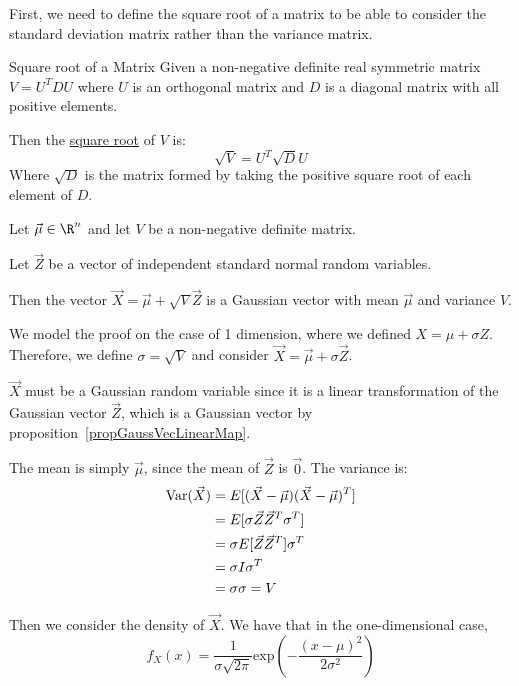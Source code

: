 \documentclass[../Main.tex]{subfiles}
\begin{document}
First, we need to define the square root of a matrix to be able to consider the standard deviation matrix rather than the variance matrix.
\begin{definition}{Square root of a Matrix}
    Given a non-negative definite real symmetric matrix $V = U^T D U$ where $U$ is an orthogonal matrix and $D$ is a diagonal matrix with all positive elements.

    Then the \underline{square root} of $V$ is:
    \begin{equation*}
        \sqrt{V} = U^T \sqrt{D} U
    \end{equation*}
    Where $\sqrt{D}$ is the matrix formed by taking the positive square root of each element of $D$.
\end{definition}
\begin{theorem}
    Let $\vec{\mu} \in \R^n$ and let $V$ be a non-negative definite matrix.

    Let $\vec{Z}$ be a vector of independent standard normal random variables.

    Then the vector $\vec{X} = \vec{\mu} + \sqrt{V} \vec{Z}$ is a Gaussian vector with mean $\vec{\mu}$ and variance $V$.
    \label{thmGeneralGaussVec}
\end{theorem}
\begin{theorem}
    We model the proof on the case of 1 dimension, where we defined $X = \mu + \sigma Z$. Therefore, we define $\sigma = \sqrt{V}$ and consider $\vec{X} = \vec{\mu} + \sigma \vec{Z}$.

    $\vec{X}$ must be a Gaussian random variable since it is a linear transformation of the Gaussian vector $\vec{Z}$, which is a Gaussian vector by proposition~\ref{propGaussVecLinearMap}.

    The mean is simply $\vec{\mu}$, since the mean of $\vec{Z}$ is $\vec{0}$. The variance is:
    \begin{align*}
        \operatorname{Var}(\vec{X}) &= E[(\vec{X} - \vec{\mu})(\vec{X} - \vec{\mu})^T] \\
        &= E[\sigma \vec{Z} \vec{Z}^T \sigma^T] \\
        &= \sigma E[\vec{Z} \vec{Z}^T] \sigma^T \\
        &= \sigma I \sigma^T \\
        &= \sigma \sigma = V
    \end{align*}
\end{theorem}
Then we consider the density of $\vec{X}$. We have that in the one-dimensional case,
\begin{equation*}
    f_X(x) = \frac{1}{\sigma\sqrt{2\pi}} \text{exp}\left(-\frac{(x - \mu)^2}{2\sigma^2}\right)
\end{equation*}
\end{document}
